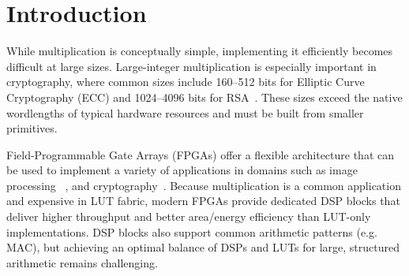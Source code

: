 \section{Introduction}
While multiplication is conceptually simple, implementing it efficiently becomes difficult at large sizes.
Large-integer multiplication is especially important in cryptography, where common sizes include 160--512 bits for Elliptic Curve Cryptography (ECC) and 1024--4096 bits for RSA~\cite{patelComparisonKeySize2023}.
These sizes exceed the native wordlengths of typical hardware resources and must be built from smaller primitives.

Field-Programmable Gate Arrays (FPGAs) offer a flexible architecture that can be used to implement a variety of applications in domains such as image processing
~\cite{sarrafzadehImageRestorationFPGA2003}, and cryptography~\cite{prasannaFHEPerformanceModelingFPGA2021}.
Because multiplication is a common application and expensive in LUT fabric, modern FPGAs provide dedicated DSP blocks that deliver higher throughput and better area/energy efficiency than LUT-only implementations.
DSP blocks also support common arithmetic patterns (e.g. MAC), but achieving an optimal balance of DSPs and LUTs for large, structured arithmetic remains challenging.


